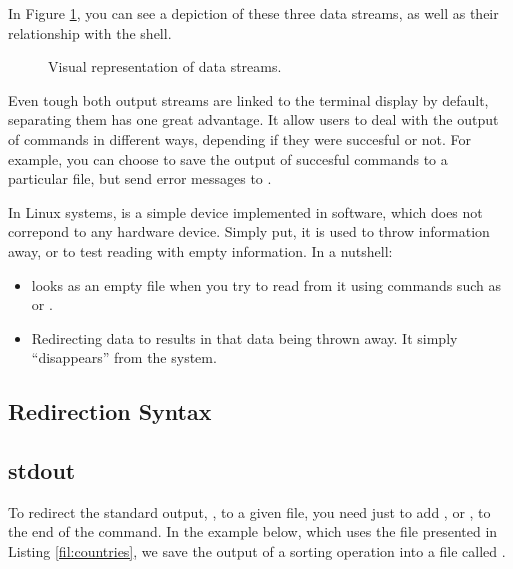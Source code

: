 In Figure \ref{fig:data_streams}, you can see a depiction of these three data streams, as well as their relationship with the shell.

\begin{figure}[!htbp]
  \centering
        
        \caption{Visual representation of data streams.}
        \label{fig:data_streams}
\end{figure}

Even tough both output streams are linked to the terminal display by default, separating them has one great advantage. It allow users to deal with the output of commands in different ways, depending if they were succesful or not. For example, you can choose to save the output of succesful commands to a particular file, but send error messages to .

\begin{my_box}
In Linux systems,  is a simple device implemented in software, which does not correpond to any hardware device. Simply put, it is used to throw information away, or to test reading with empty information. In a nutshell:
\begin{itemize}
\item {} looks as an empty file when you try to read from it using commands such as  or .
\item Redirecting data to  results in that data being thrown away. It simply ``disappears'' from the system.
\end{itemize}
\end{my_box}

\subsection{Redirection Syntax}

\subsection*{stdout}

To redirect the standard output, , to a given file, you need just to add ,  or ,   to the end of the command. In the example below, which uses the file  presented in Listing \ref{fil:countries}, we save the output of a sorting operation into a file called .

